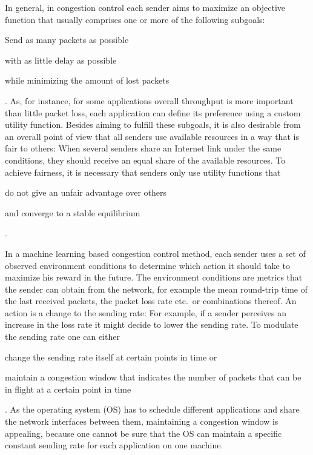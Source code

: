 \documentclass[newfonts=false,format=sigconf,10pt,letterpaper]{acmart}
\begin{document}
In general, in congestion control each sender aims to maximize an objective function that usually comprises one or more of the following subgoals:
\begin{enumerate*}
\item Send as many packets as possible
\item with as little delay as possible
\item while minimizing the amount of lost packets
\end{enumerate*}. 
As, for instance, for some applications overall throughput is more important than little packet loss, each application can define its preference using a custom utility function. Besides aiming to fulfill these subgoals, it is also desirable from an overall point of view that all senders use available resources in a way that is fair to others: When several senders share an Internet link under the same conditions, they should receive an equal share of the available resources. To achieve fairness, it is necessary that senders only use utility functions that 
\begin{enumerate*}
\item do not give an unfair advantage over others
\item and converge to a stable equilibrium
\end{enumerate*}.

In a machine learning based congestion control method, each sender uses a set of observed environment conditions to determine which action it should take to maximize his reward in the future. The environment conditions are metrics that the sender can obtain from the network, for example the mean round-trip time of the last received packets, the packet loss rate etc.~or combinations thereof. An action is a change to the sending rate: For example, if a sender perceives an increase in the loss rate it might decide to lower the sending rate. To modulate the sending rate one can  either
\begin{enumerate*}
\item change the sending rate itself at certain points in time or
\item maintain a congestion window that indicates the number of packets that can be in flight at a certain point in time
\end{enumerate*}. As the operating system (OS) has to schedule different applications and share the network interfaces between them, maintaining a congestion window is appealing, because one cannot be sure that the OS can maintain a specific constant sending rate for each application on one machine. 
\end{document}
